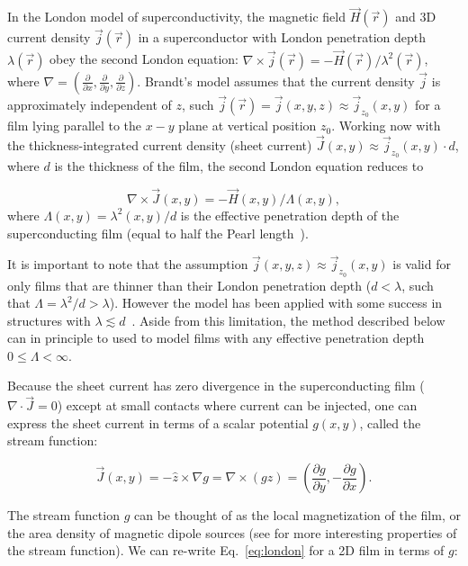 \documentclass[preprint,12pt]{elsarticle}
\newcounter{bla}
\begin{document}
In the London model of superconductivity, the magnetic field $\vec{H}(\vec{r})$ and 3D current density $\vec{j}(\vec{r})$ in a superconductor with London penetration depth $\lambda(\vec{r})$ obey the second London equation:
$\nabla\times\vec{j}(\vec{r})=-\vec{H}(\vec{r})/\lambda^2(\vec{r})$, where
$\nabla=\left(\frac{\partial}{\partial x}, \frac{\partial}{\partial y}, \frac{\partial}{\partial z}\right)$. Brandt's model assumes that the current density $\vec{j}$ is approximately independent of $z$, such $\vec{j}(\vec{r}) = \vec{j}(x, y, z)\approx\vec{j}_{z_0}(x, y)$ for a film lying parallel to the $x-y$ plane at vertical position $z_0$. Working now with the thickness-integrated current density (sheet current) $\vec{J}(x, y)\approx\vec{j}_{z_0}(x, y)\cdot d$, where $d$
is the thickness of the film, the second London equation reduces to

\begin{equation}
    \label{eq:london}
    \nabla\times\vec{J}(x, y)=-\vec{H}(x, y)/\Lambda(x, y),
\end{equation}
where $\Lambda(x, y)=\lambda^2(x, y)/d$ is the effective penetration depth
of the superconducting film (equal to half the Pearl length~\cite{pearl_current_1964}).

It is important to note that the assumption $\vec{j}(x, y, z)\approx\vec{j}_{z_0}(x, y)$ is valid for only films that are thinner than their London penetration depth ($d<\lambda$, such that $\Lambda=\lambda^2/d>\lambda$). However the model has been applied with some success in structures with $\lambda\lesssim d$~\cite{kirtley_scanning_2016,kirtley_response_2016}. Aside from this limitation, the method described below can in principle to used to model films with any effective penetration depth $0\leq\Lambda<\infty$.

Because the sheet current has zero divergence in the superconducting film ($\nabla\cdot\vec{J}=0$)
except at small contacts where current can be injected, one can express the sheet current in terms
of a scalar potential $g(x, y)$, called the stream function:

\begin{equation}
    \label{eq:stream}
    \vec{J}(x, y) = -\hat{z}\times\nabla g
    = \nabla\times(g\hat{z})
    = \left(\frac{\partial g}{\partial y}, -\frac{\partial g}{\partial x}\right).
\end{equation}

The stream function $g$ can be thought of as the local magnetization of the film, or the area density of magnetic dipole sources (see \cite{brandt_thin_2005} for more interesting properties of the stream function). We can re-write Eq.~\ref{eq:london} for a 2D film in terms of $g$:
\end{document}
